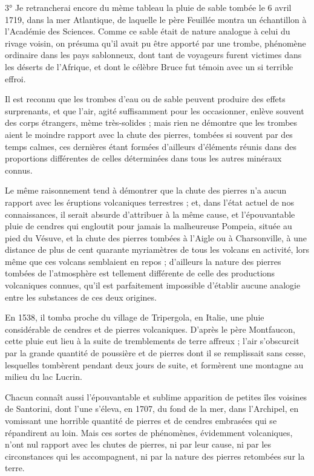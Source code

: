 \documentclass[a4paper, 12pt, oneside, french]{article}
\begin{document}
3° Je retrancherai encore du mème tableau la pluie de sable tombée le 6 avril 1719, dans la mer Atlantique, de laquelle le père Feuillée montra un échantillon à l'Académie des Sciences. Comme ce sable était de nature analogue à celui du rivage voisin, on présuma qu'il avait pu être apporté par une trombe, phénomène ordinaire dans les pays sablonneux, dont tant de voyageurs furent victimes dans les déserts de l'Afrique, et dont le célèbre Bruce fut témoin avec un si terrible effroi.

Il est reconnu que les trombes d'eau ou de sable peuvent produire des effets surprenants, et que l'air, agité suffisamment pour les occasionner, enlève souvent des corps étrangers, mème très-solides ; mais rien ne démontre que les trombes aient le moindre rapport avec la chute des pierres, tombées si souvent par des temps calmes, ces dernières étant formées d'ailleurs d'éléments réunis dans des proportions différentes de celles déterminées dans tous les autres minéraux connus.

Le même raisonnement tend à démontrer que la chute des pierres n'a aucun rapport avec les éruptions volcaniques terrestres ; et, dans l'état actuel de nos connaissances, il serait absurde d'attribuer à la même cause, et l'épouvantable pluie de cendres qui engloutit pour jamais la malheureuse Pompeia, située au pied du Vésuve, et la chute des pierres tombées à l'Aigle ou à Charsonville, à une distance de plus de cent quarante myriamètres de tous les volcans en activité, lors même que ces volcans semblaient en repos ; d'ailleurs la nature des pierres tombées de l'atmosphère est tellement différente de celle des productions volcaniques connues, qu'il est parfaitement impossible d'établir aucune analogie entre les substances de ces deux origines.

En 1538, il tomba proche du village de Tripergola, en Italie, une pluie considérable de cendres et de pierres volcaniques. D'après le père Montfaucon, cette pluie eut lieu à la suite de tremblements de terre affreux ; l'air s'obscurcit par la grande quantité de poussière et de pierres dont il se remplissait sans cesse, lesquelles tombèrent pendant deux jours de suite, et formèrent une montagne au milieu du lac Lucrin.

Chacun connaît aussi l'épouvantable et sublime apparition de petites îles voisines de Santorini, dont l'une s'éleva, en 1707, du fond de la mer, dans l'Archipel, en vomissant une horrible quantité de pierres et de cendres embrasées qui se répandirent au loin. Mais ces sortes de phénomènes, évidemment volcaniques, n'ont nul rapport avec les chutes de pierres, ni par leur cause, ni par les circonstances qui les accompagnent, ni par la nature des pierres retombées sur la terre.
\end{document}

